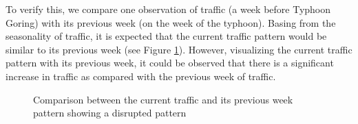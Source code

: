 


To verify this, we compare one observation of traffic (a week before Typhoon Goring) with its previous week (on the week of the typhoon). Basing from the seasonality of traffic, it is expected that the current traffic pattern would be similar to its previous week (see Figure \ref{figure_traffic_disrupted}). However, visualizing the current traffic pattern with its previous week, it could be observed that there is a significant increase in traffic as compared with the previous week of traffic.

\begin{figure}[h] 
\centering
  \caption{Comparison between the current traffic and its previous week pattern showing a disrupted pattern}
  \label{figure_traffic_disrupted}
\end{figure}













































